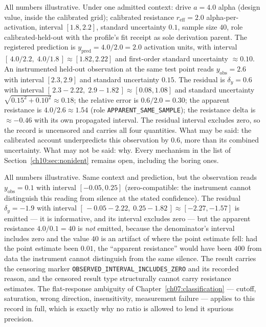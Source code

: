 \begin{example}\label{ch10:ex:residual}
All numbers illustrative. Under one admitted context: drive $a = 4.0$
alpha (design value, inside the calibrated grid); calibrated resistance
$r_{\mathrm{eff}} = 2.0$ alpha-per-activation, interval $[1.8, 2.2]$,
standard uncertainty $0.1$, sample size $40$, role
calibrated-held-out with the profile's fit receipt as sole derivation
parent. The registered prediction is $y_{\mathrm{pred}} = 4.0 / 2.0 =
2.0$ activation units, with interval
$[\,4.0/2.2,\; 4.0/1.8\,] \approx [1.82, 2.22]$ and first-order standard
uncertainty $\approx 0.10$. An instrumented held-out observation at the
same test point reads $y_{\mathrm{obs}} = 2.6$ with interval
$[2.3, 2.9]$ and standard uncertainty $0.15$. The residual is
$\delta_y = 0.6$ with interval
$[\,2.3 - 2.22,\; 2.9 - 1.82\,] \approx [0.08, 1.08]$ and standard
uncertainty $\sqrt{0.15^2 + 0.10^2} \approx 0.18$; the relative error is
$0.6 / 2.0 = 0.30$; the apparent resistance is $4.0 / 2.6 \approx 1.54$
(role \texttt{APPARENT\_SAME\_SAMPLE}); the resistance delta is
$\approx -0.46$ with its own propagated interval. The residual interval
excludes zero, so the record is uncensored and carries all four
quantities. What may be said: the calibrated account underpredicts this
observation by $0.6$, more than its combined uncertainty. What may not
be said: why. Every mechanism in the list of
Section~\ref{ch10:sec:nonident} remains open, including the boring
ones.
\end{example}

\begin{example}\label{ch10:ex:censored}
All numbers illustrative. Same context and prediction, but the
observation reads $y_{\mathrm{obs}} = 0.1$ with interval $[-0.05, 0.25]$
(zero-compatible: the instrument cannot distinguish this reading from
silence at the stated confidence). The residual $\delta_y = -1.9$ with
interval $[\,-0.05 - 2.22,\; 0.25 - 1.82\,] \approx [-2.27, -1.57]$ is
emitted --- it is informative, and its interval excludes zero --- but
the apparent resistance $4.0 / 0.1 = 40$ is \emph{not} emitted, because
the denominator's interval includes zero and the value $40$ is an
artifact of where the point estimate fell: had the point estimate been
$0.01$, the ``apparent resistance'' would have been $400$ from data the
instrument cannot distinguish from the same silence. The result carries
the censoring marker \texttt{OBSERVED\_INTERVAL\_INCLUDES\_ZERO} and its
recorded reason, and the censored result type structurally cannot carry
resistance estimates. The flat-response ambiguity of
Chapter~\ref{ch07:classification} --- cutoff, saturation, wrong
direction, insensitivity, measurement failure --- applies to this record
in full, which is exactly why no ratio is allowed to lend it spurious
precision.
\end{example}

